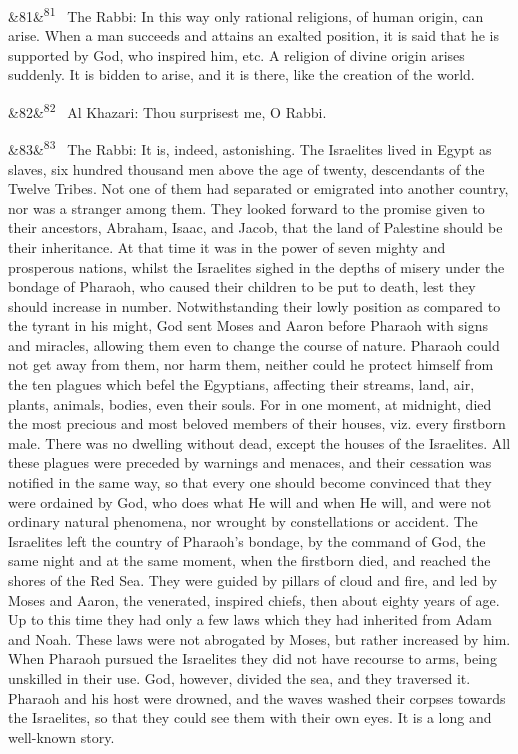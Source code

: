 \documentclass[12pt]{article}
\newcommand{\para}[1][]{\par\noindent\ifx&#1&\else\textsuperscript{\footnotesize #1}~\fi}
\begin{document}
\para[81] The Rabbi: In this way only rational religions, of human origin, can arise. When a man succeeds and attains an exalted position, it is said that he is supported by God, who inspired him, etc. A religion of divine origin arises suddenly. It is bidden to arise, and it is there, like the creation of the world.

\para[82] Al Khazari: Thou surprisest me, O Rabbi.

\para[83] The Rabbi: It is, indeed, astonishing. The Israelites lived in Egypt as slaves, six hundred thousand men above the age of twenty, descendants of the Twelve Tribes. Not one of them had separated or emigrated into another country, nor was a stranger among them. They looked forward to the promise given to their ancestors, Abraham, Isaac, and Jacob, that the land of Palestine should be their inheritance. At that time it was in the power of seven mighty and prosperous nations, whilst the Israelites sighed in the depths of misery under the bondage of Pharaoh, who caused their children to be put to death, lest they should increase in number. Notwithstanding their lowly position as compared to the tyrant in his might, God sent Moses and Aaron before Pharaoh with signs and miracles, allowing them even to change the course of nature. Pharaoh could not get away from them, nor harm them, neither could he protect himself from the ten plagues which befel the Egyptians, affecting their streams, land, air, plants, animals, bodies, even their souls. For in one moment, at midnight, died the most precious and most beloved members of their houses, viz. every firstborn male. There was no dwelling without dead, except the houses of the Israelites. All these plagues were preceded by warnings and menaces, and their cessation was notified in the same way, so that every one should become convinced that they were ordained by God, who does what He will and when He will, and were not ordinary natural phenomena, nor wrought by constellations or accident. The Israelites left the country of Pharaoh's bondage, by the command of God, the same night and at the same moment, when the firstborn died, and reached the shores of the Red Sea. They were guided by pillars of cloud and fire, and led by Moses and Aaron, the venerated, inspired chiefs, then about eighty years of age. Up to this time they had only a few laws which they had inherited from Adam and Noah. These laws were not abrogated by Moses, but rather increased by him. When Pharaoh pursued the Israelites they did not have recourse to arms, being unskilled in their use. God, however, divided the sea, and they traversed it. Pharaoh and his host were drowned, and the waves washed their corpses towards the Israelites, so that they could see them with their own eyes. It is a long and well-known story.
\end{document}
